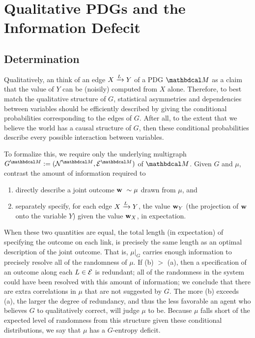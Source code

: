 \documentclass[the-pdg-manual.tex]{subfiles}
\begin{document}
	\section{Qualitative PDGs and the Information Defecit}\label{sec:details-on-joint-scoring}
	\subsection{Determination}

	Qualitatively, an think of an edge $\ed LXY$ of a PDG $\dg M$ as a claim that the value of $Y$ can be (noisily) computed from
	$X$ alone.  
	Therefore, to best match the qualitative structure of $G$, statistical asymmetries and dependencies between variables should
	be efficiently described by giving the conditional probabilities corresponding to the edges of $G$. After all, to the extent that we believe the world has a causal structure of $G$, then these conditional probabilities describe every possible interaction between variables. 

	To formalize this, we require only the underlying multigraph $G^{\dg M} :=
	(\N^{\dg M}, \Ed^{\dg M})$ of $\dg M$. 
	Given $G$ and $\mu$, contrast the amount of
	information required to 
	\begin{enumerate}[label=(\alph*)]
		\item directly describe a joint outcome  $\mathbf w ~ \sim \mu$
		drawn from $\mu$, and 
		\item separately specify, for each edge $\ed LXY$, the value
		$\mathbf w_Y$ (the projection of $\mathbf w$ onto the variable
		$Y$) given the value $\mathbf w_X$, in expectation. 
	\end{enumerate}
	When these two quantities are equal, the total length (in expectation) of specifying the outcome on each link, is precisely the same length as an optimal description of the joint outcome. That is, $\mu|_G$ carries enough information to precisely resolve all of the randomness of $\mu$. If (b) $>$ (a), then a specification of an outcome along each $L \in \mathcal E$ is redundant; all of the randomness in the system could have been resolved with this amount of information; we conclude that there are extra correlations in $\mu$ that are not suggested by $G$. The more (b) exceeds (a), the larger the degree of redundancy, and thus the less favorable an agent who believes $G$ to qualitatively correct, will judge $\mu$ to be. Because $\mu$ falls short of the expected level of randomness from this structure given these conditional distributions, we say that $\mu$ has a $G$-entropy deficit.
\end{document}
